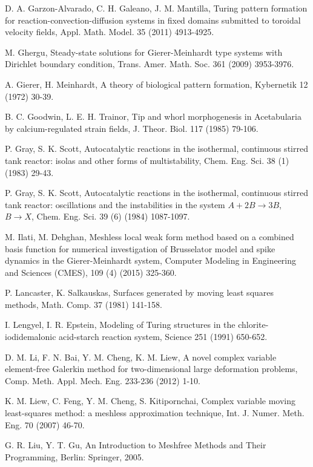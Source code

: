 \documentclass[12pt]{article}
\numberwithin{equation}{section}
\begin{document}
\begin{thebibliography}{99}
 D. A. Garzon-Alvarado, C. H. Galeano, J. M. Mantilla, Turing pattern formation for reaction-convection-diffusion systems in fixed domains submitted to toroidal velocity fields, Appl. Math. Model. 35 (2011) 4913-4925.

 M. Ghergu, Steady-state solutions for Gierer-Meinhardt type systems with Dirichlet boundary
condition, Trans. Amer. Math. Soc. 361 (2009) 3953-3976.

 A. Gierer, H. Meinhardt, A theory of biological pattern formation, Kybernetik 12 (1972) 30-39.

  B. C. Goodwin, L. E. H. Trainor, Tip and whorl morphogenesis in Acetabularia by calcium-regulated strain fields, J. Theor. Biol. 117 (1985) 79-106.

 P. Gray,  S. K. Scott,  Autocatalytic reactions in the isothermal, continuous stirred tank reactor: isolas and
other forms of multistability, Chem. Eng. Sci. 38 (1) (1983) 29-43.

  P. Gray,  S. K. Scott, Autocatalytic reactions in the isothermal, continuous stirred tank reactor: oscillations and the instabilities in the system $A+2B\rightarrow3B$, $B\rightarrow X$, Chem. Eng. Sci. 39 (6) (1984) 1087-1097.

 M. Ilati, M. Dehghan, Meshless local weak form method based on a combined basis function for numerical investigation of Brusselator model and spike dynamics in the Gierer-Meinhardt system, Computer Modeling in Engineering and Sciences (CMES), 109 (4) (2015) 325-360.

  P. Lancaster, K. Salkauskas, Surfaces generated by moving least
squares methods, Math. Comp. 37  (1981) 141-158.

 I. Lengyel, I. R. Epstein, Modeling of Turing structures in the chlorite-iodidemalonic acid-starch reaction system, Science 251 (1991) 650-652.

 D. M. Li, F. N. Bai, Y. M. Cheng, K. M. Liew, A novel complex variable element-free Galerkin method for two-dimensional large deformation problems, Comp. Meth. Appl. Mech. Eng. 233-236 (2012) 1-10.

 K. M. Liew, C. Feng, Y. M. Cheng, S. Kitipornchai, Complex variable moving least-squares method: a meshless approximation technique, Int. J. Numer. Meth. Eng. 70 (2007) 46-70.

 G. R. Liu, Y. T. Gu, An Introduction to Meshfree Methods and Their Programming, Berlin: Springer, 2005.


\end{thebibliography}
\end{document}
